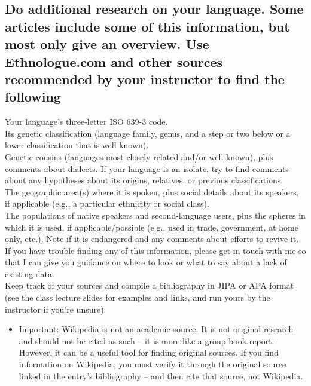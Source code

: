 \documentclass[12pt]{article}
\begin{document}
\subsection*{Do additional research on your language.  Some articles include some of this information, but most only give an overview.  Use Ethnologue.com and other sources recommended by your instructor to find the following}
Your language’s three-letter ISO 639-3 code.\\
Its genetic classification (language family, genus, and a step or two below or a lower classification that is well known).\\
Genetic cousins (languages most closely related and/or well-known), plus comments about dialects.  If your language is an isolate, try to find comments about any hypotheses about its origins, relatives, or previous classifications.\\
The geographic area(s) where it is spoken, plus social details about its speakers, if applicable (e.g., a particular ethnicity or social class).\\
The populations of native speakers and second-language users, plus the spheres in which it is used, if applicable/possible (e.g., used in trade, government, at home only, etc.).  Note if it is endangered and any comments about efforts to revive it.\\
If you have trouble finding any of this information, please get in touch with me so that I can give you guidance on where to look or what to say about a lack of existing data.\\
Keep track of your sources and compile a bibliography in JIPA or APA format (see the class lecture slides for examples and links, and run yours by the instructor if you’re unsure).\\
\begin{itemize}
\item Important:  Wikipedia is not an academic source.  It is not original research and should not be cited as such – it is more like a group book report.  However, it can be a useful tool for finding original sources.  If you find information on Wikipedia, you must verify it through the original source linked in the entry’s bibliography – and then cite that source, not Wikipedia.
\end{itemize}
\end{document}
